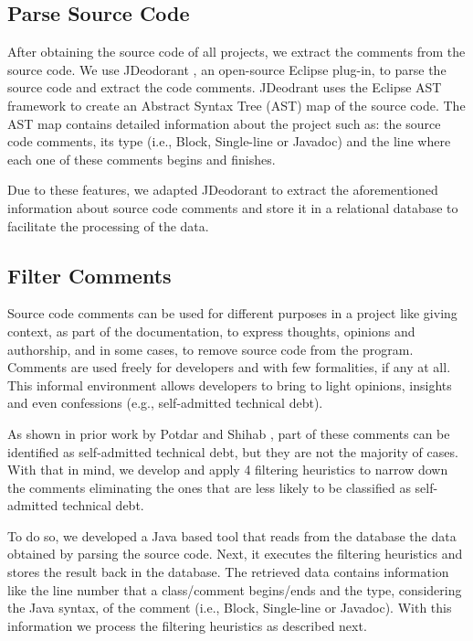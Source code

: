 \subsection{Parse Source Code} %
\label{sub:parse_source_code}

After obtaining the source code of all projects, we extract the comments from the source code. We use JDeodorant \cite{Tsantalis2008CSMR}, an open-source Eclipse plug-in, to parse the source code and extract the code comments. JDeodrant uses the Eclipse AST framework to create an Abstract Syntax Tree (AST) map of the source code. The AST map contains detailed information about the project such as: the source code comments, its type (i.e., Block, Single-line or Javadoc) and the line where each one of these comments begins and finishes. 

Due to these features, we adapted JDeodorant to extract the aforementioned information about source code comments and store it in a relational database to facilitate the processing of the data.

\subsection{Filter Comments} %
\label{sub:filter_comments}

Source code comments can be used for different purposes in a project like giving context, as part of the documentation, to express thoughts, opinions and authorship, and in some cases, to remove source code from the program. Comments are used freely for developers and with few formalities, if any at all. This informal environment allows developers to bring to light opinions, insights and even confessions (e.g., self-admitted technical debt). 

As shown in prior work by Potdar and Shihab \cite{Potdar2014ICSME}, part of these comments can be identified as self-admitted technical debt, but they are not the majority of cases. With that in mind, we develop and apply 4 filtering heuristics to narrow down the comments eliminating the ones that are less likely to be classified as self-admitted technical debt.

To do so, we developed a Java based tool that reads from the database the data obtained by parsing the source code. Next, it executes the filtering heuristics and stores the result back in the database. The retrieved data contains information like the line number that a class/comment begins/ends and the type, considering the Java syntax, of the comment (i.e., Block, Single-line or Javadoc). With this information we process the filtering heuristics as described next.

